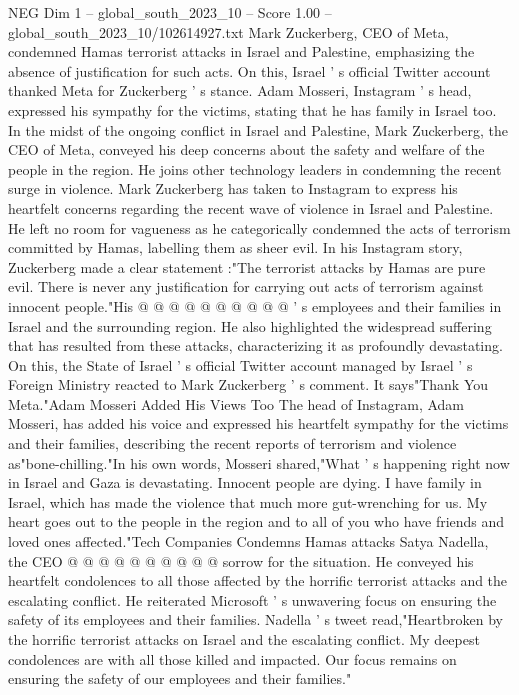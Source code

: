 \begin{textsample}{NEG Dim 1 – global\_south\_2023\_10 – Score 1.00 – global\_south\_2023\_10/102614927.txt}  \label{ex:f1_neg_260}
Mark Zuckerberg, CEO of Meta, condemned Hamas terrorist attacks in Israel and Palestine, emphasizing the absence of justification for such acts.
On this, Israel ' s official Twitter account thanked Meta for Zuckerberg ' s stance.
Adam Mosseri, Instagram ' s head, expressed his sympathy for the victims, stating that he has family in Israel too.
In the midst of the ongoing conflict in Israel and Palestine, Mark Zuckerberg, the CEO of Meta, conveyed his deep concerns about the safety and welfare of the people in the region.
He joins other technology leaders in condemning the recent surge in violence.
Mark Zuckerberg has taken to Instagram to express his heartfelt concerns regarding the recent wave of violence in Israel and Palestine.
He left no room for vagueness as he categorically condemned the acts of terrorism committed by Hamas, labelling them as sheer evil.
In his Instagram story, Zuckerberg made a clear statement :"The terrorist attacks by Hamas are pure evil.
There is never any justification for carrying out acts of terrorism against innocent people."His @ @ @ @ @ @ @ @ @ @ ' s employees and their families in Israel and the surrounding region.
He also highlighted the widespread suffering that has resulted from these attacks, characterizing it as profoundly devastating.
On this, the State of Israel ' s official Twitter account managed by Israel ' s Foreign Ministry reacted to Mark Zuckerberg ' s comment.
It says"Thank You Meta."Adam Mosseri Added His Views Too The head of Instagram, Adam Mosseri, has added his voice and expressed his heartfelt sympathy for the victims and their families, describing the recent reports of terrorism and violence as"bone-chilling."In his own words, Mosseri shared,"What ' s happening right now in Israel and Gaza is devastating.
Innocent people are dying.
I have family in Israel, which has made the violence that much more gut-wrenching for us.
My heart goes out to the people in the region and to all of you who have friends and loved ones affected."Tech Companies Condemns Hamas attacks Satya Nadella, the CEO @ @ @ @ @ @ @ @ @ @ sorrow for the situation.
He conveyed his heartfelt condolences to all those affected by the horrific terrorist attacks and the escalating conflict.
He reiterated Microsoft ' s unwavering focus on ensuring the safety of its employees and their families.
Nadella ' s tweet read,"Heartbroken by the horrific terrorist attacks on Israel and the escalating conflict.
My deepest condolences are with all those killed and impacted.
Our focus remains on ensuring the safety of our employees and their families."

\end{textsample}
